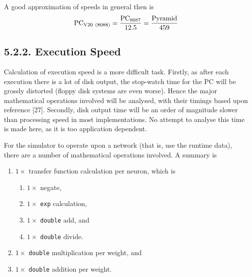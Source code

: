 \documentclass[12pt]{report}
\begin{document}
A good approximation of speeds in general then is
$$
{\rm PC}_{\rm V20\ (8088)} = {{\rm PC}_{\rm 8087} \over 12.5} 
			= {{\rm Pyramid} \over 459}
$$

\subsection{5.2.2. Execution Speed}

Calculation of execution speed is a more difficult task.
Firstly, as after each execution there is a lot of disk output, the
stop-watch time for the PC will be grossly distorted (floppy disk
systems are even worse).
Hence the major mathematical operations involved will be analysed,
with their timings based upon reference [27].
Secondly, disk output time will be an order of magnitude slower than
processing speed in most implementations.
No attempt to analyse this time is made here, as it is too
application dependent.

For the simulator to operate upon a network (that is, use the
runtime data), there are a number of mathematical operations
involved. A summary is
\begin{enumerate}
\item $1\times$ transfer function calculation per neuron, which is
\begin{enumerate}
\item $1 \times$ negate,
\item $1\times$ \texttt{exp} calculation,
\item $1\times$ \texttt{double} add, and
\item $1\times$ \texttt{double} divide.
\end{enumerate}
\item $1\times$ \texttt{double} multiplication per weight, and
\item $1\times$ \texttt{double} addition per weight.
\end{enumerate}
\end{document}
